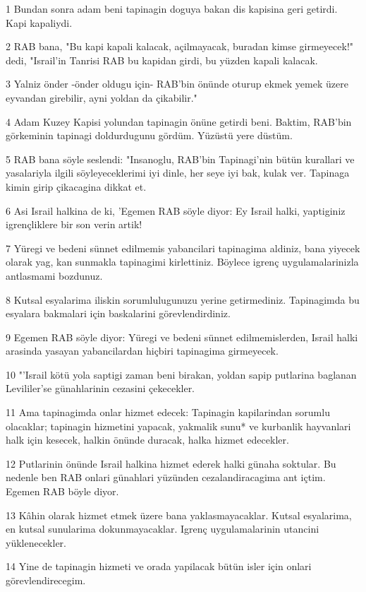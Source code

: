 \par 1 Bundan sonra adam beni tapinagin doguya bakan dis kapisina geri getirdi. Kapi kapaliydi.
\par 2 RAB bana, "Bu kapi kapali kalacak, açilmayacak, buradan kimse girmeyecek!" dedi, "Israil'in Tanrisi RAB bu kapidan girdi, bu yüzden kapali kalacak.
\par 3 Yalniz önder -önder oldugu için- RAB'bin önünde oturup ekmek yemek üzere eyvandan girebilir, ayni yoldan da çikabilir."
\par 4 Adam Kuzey Kapisi yolundan tapinagin önüne getirdi beni. Baktim, RAB'bin görkeminin tapinagi doldurdugunu gördüm. Yüzüstü yere düstüm.
\par 5 RAB bana söyle seslendi: "Insanoglu, RAB'bin Tapinagi'nin bütün kurallari ve yasalariyla ilgili söyleyeceklerimi iyi dinle, her seye iyi bak, kulak ver. Tapinaga kimin girip çikacagina dikkat et.
\par 6 Asi Israil halkina de ki, 'Egemen RAB söyle diyor: Ey Israil halki, yaptiginiz igrençliklere bir son verin artik!
\par 7 Yüregi ve bedeni sünnet edilmemis yabancilari tapinagima aldiniz, bana yiyecek olarak yag, kan sunmakla tapinagimi kirlettiniz. Böylece igrenç uygulamalarinizla antlasmami bozdunuz.
\par 8 Kutsal esyalarima iliskin sorumlulugunuzu yerine getirmediniz. Tapinagimda bu esyalara bakmalari için baskalarini görevlendirdiniz.
\par 9 Egemen RAB söyle diyor: Yüregi ve bedeni sünnet edilmemislerden, Israil halki arasinda yasayan yabancilardan hiçbiri tapinagima girmeyecek.
\par 10 "'Israil kötü yola saptigi zaman beni birakan, yoldan sapip putlarina baglanan Levililer'se günahlarinin cezasini çekecekler.
\par 11 Ama tapinagimda onlar hizmet edecek: Tapinagin kapilarindan sorumlu olacaklar; tapinagin hizmetini yapacak, yakmalik sunu* ve kurbanlik hayvanlari halk için kesecek, halkin önünde duracak, halka hizmet edecekler.
\par 12 Putlarinin önünde Israil halkina hizmet ederek halki günaha soktular. Bu nedenle ben RAB onlari günahlari yüzünden cezalandiracagima ant içtim. Egemen RAB böyle diyor.
\par 13 Kâhin olarak hizmet etmek üzere bana yaklasmayacaklar. Kutsal esyalarima, en kutsal sunularima dokunmayacaklar. Igrenç uygulamalarinin utancini yüklenecekler.
\par 14 Yine de tapinagin hizmeti ve orada yapilacak bütün isler için onlari görevlendirecegim.
